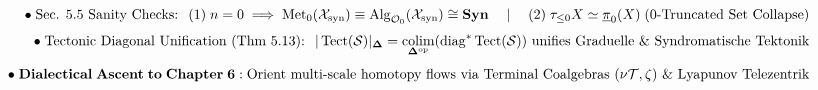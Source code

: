 \documentclass[preview]{standalone}
\begin{document}
\begin{align*}
\special{dvisvgm:raw <g id='unique000'>}\bullet\;\text{Sec. 5.5 Sanity Checks: }\; (1)\;n=0 \implies \operatorname{Met}_0(\mathcal{X}_{\text{syn}}) \equiv \operatorname{Alg}_{\mathcal{O}_0}(\mathcal{X}_{\text{syn}}) \cong \mathbf{Syn} \quad\mid\quad (2)\;\tau_{\le 0}X \simeq \underline{\pi}_0(X)\;(\text{0-Truncated Set Collapse})\\[4pt]\bullet\;\text{Tectonic Diagonal Unification (Thm 5.13): }\; |\operatorname{Tect}(\mathcal{S})|_{\mathbf{\Delta}} = \operatorname*{colim}_{\mathbf{\Delta}^{\text{op}}}(\operatorname{diag}^*\operatorname{Tect}(\mathcal{S})) \text{ unifies Graduelle \& Syndromatische Tektonik}\\[4pt]\bullet\;\mathbf{Dialectical\;Ascent\;to\;Chapter\;6:}\;\text{Orient multi-scale homotopy flows via Terminal Coalgebras }(\nu\mathcal{T},\zeta)\text{ \& Lyapunov Telezentrik}\special{dvisvgm:raw </g>}
\end{align*}
\end{document}
